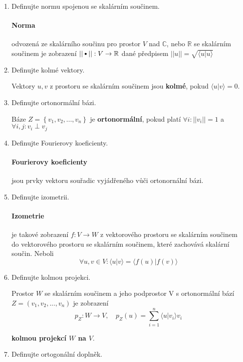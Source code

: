 \documentclass[10pt,a4paper]{article}
\newcommand\sbullet[1][.5]{\mathbin{\vcenter{\hbox{\scalebox{#1}{$\bullet$}}}}}
\theoremstyle{plain}
\begin{document}
\begin{enumerate}
\item Definujte normu spojenou se skalárním součinem.

\paragraph{Norma} odvozená ze skalárního součinu pro prostor $V$ nad $\mathbb{C}$, nebo $\mathbb{R}$ se skalárním součinem je zobrazení $|| \sbullet[.75]|| : V \to \mathbb{R}$ dané předpisem $||u|| = \sqrt{\langle u | u \rangle}$

\item Definujte kolmé vektory.

Vektory $u,v$ z prostoru se skalárním součinem jsou \textbf{kolmé}, pokud $\langle u | v \rangle = 0$. 

\item Definujte ortonormální bázi.

Báze $Z = \left\lbrace v_1, v_2, ..., v_n \right\rbrace$ je \textbf{ortonormální}, pokud platí $ \forall i: ||v_i|| = 1 $ a $ \forall i,j: v_i \perp v_j $

\item Definujte Fourierovy koeficienty.

\paragraph{Fourierovy koeficienty} jsou prvky vektoru souřadic vyjádřeného vůči ortonornální bázi.

\item Definujte izometrii.

\paragraph{Izometrie} je takové zobrazení $f: V \to W$ z vektorového prostoru se skalárním součinem do vektorového prostoru se skalárním součinem, které zachovává skalární součin. Neboli \[\forall u,v \in V: \langle u | v \rangle = \langle f(u) | f(v) \rangle\]

\item Definujte kolmou projekci.

Prostor $W$ se skalárním součinem a jeho podprostor V s ortonormální bází  $Z = ( v_1, v_2, ..., v_n ) $ je zobrazení 
\[ p_Z: W \to V,\quad p_Z(u) = \sum^n_{i=1} \langle u|v_i \rangle v_i \]

\textbf{kolmou projekcí $W$ na $V$}.

\item Definujte ortogonální doplněk.


\end{enumerate}
\end{document}
